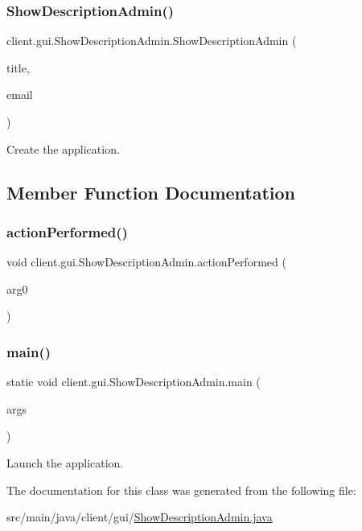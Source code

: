 \subsubsection{\texorpdfstring{Show\+Description\+Admin()}{ShowDescriptionAdmin()}}
{\footnotesize\ttfamily client.\+gui.\+Show\+Description\+Admin.\+Show\+Description\+Admin (\begin{DoxyParamCaption}\item[{String}]{title,  }\item[{String}]{email }\end{DoxyParamCaption})}

Create the application. 

\subsection{Member Function Documentation}
\mbox{\label{classclient_1_1gui_1_1_show_description_admin_ae39552f7efb7cc8078f736c63ee9c4e4}} 
\subsubsection{\texorpdfstring{action\+Performed()}{actionPerformed()}}
{\footnotesize\ttfamily void client.\+gui.\+Show\+Description\+Admin.\+action\+Performed (\begin{DoxyParamCaption}\item[{Action\+Event}]{arg0 }\end{DoxyParamCaption})}

\mbox{\label{classclient_1_1gui_1_1_show_description_admin_a1309c0192e30d9545a20f7dd1a05af2a}} 
\subsubsection{\texorpdfstring{main()}{main()}}
{\footnotesize\ttfamily static void client.\+gui.\+Show\+Description\+Admin.\+main (\begin{DoxyParamCaption}\item[{String \mbox{[}$\,$\mbox{]}}]{args }\end{DoxyParamCaption})\hspace{0.3cm}{\ttfamily [static]}}

Launch the application. 

The documentation for this class was generated from the following file\+:\begin{DoxyCompactItemize}
\item 
src/main/java/client/gui/\hyperlink{_show_description_admin_8java}{Show\+Description\+Admin.\+java}\end{DoxyCompactItemize}
